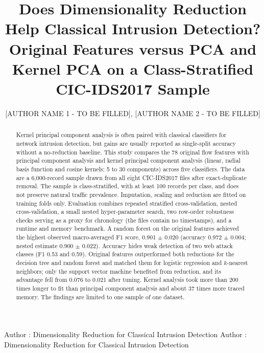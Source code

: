 \documentclass{ieeeaccess}
\begin{document}

\title{Does Dimensionality Reduction Help Classical Intrusion Detection? Original Features versus PCA and Kernel PCA on a Class-Stratified CIC-IDS2017 Sample}
\author{\uppercase{[AUTHOR NAME 1 - TO BE FILLED]},
\uppercase{[AUTHOR NAME 2 - TO BE FILLED]}}

\address[1]{[DEPARTMENT, INSTITUTION, CITY, COUNTRY - TO BE FILLED] (e-mail: [EMAIL - TO BE FILLED])}
\address[2]{[DEPARTMENT, INSTITUTION, CITY, COUNTRY - TO BE FILLED] (e-mail: [EMAIL - TO BE FILLED])}

\markboth
{Author \headeretal: Dimensionality Reduction for Classical Intrusion Detection}
{Author \headeretal: Dimensionality Reduction for Classical Intrusion Detection}


\begin{abstract}
Kernel principal component analysis is often paired with classical classifiers for network intrusion detection, but gains are usually reported as single-split accuracy without a no-reduction baseline. This study compares the 78 original flow features with principal component analysis and kernel principal component analysis (linear, radial basis function and cosine kernels; 5 to 30 components) across five classifiers. The data are a 6,000-record sample drawn from all eight CIC-IDS2017 files after exact-duplicate removal. The sample is class-stratified, with at least 100 records per class, and does not preserve natural traffic prevalence. Imputation, scaling and reduction are fitted on training folds only. Evaluation combines repeated stratified cross-validation, nested cross-validation, a small nested hyper-parameter search, two row-order robustness checks serving as a proxy for chronology (the files contain no timestamps), and a runtime and memory benchmark. A random forest on the original features achieved the highest observed macro-averaged F1 score, 0.901 $\pm$ 0.020 (accuracy 0.972 $\pm$ 0.004; nested estimate 0.900 $\pm$ 0.022). Accuracy hides weak detection of two web attack classes (F1 0.53 and 0.59). Original features outperformed both reductions for the decision tree and random forest and matched them for logistic regression and $k$-nearest neighbors; only the support vector machine benefited from reduction, and its advantage fell from 0.076 to 0.021 after tuning. Kernel analysis took more than 200 times longer to fit than principal component analysis and about 37 times more traced memory. The findings are limited to one sample of one dataset.
\end{abstract}
\end{document}
